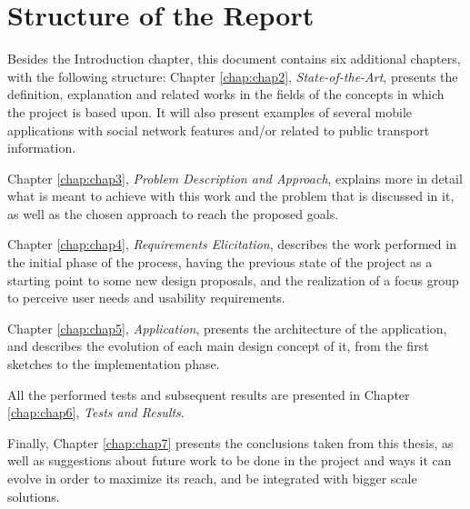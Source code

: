 \section{Structure of the Report} \label{sec:struct}

Besides the Introduction chapter, this document contains six additional chapters, with the following structure:
Chapter \ref{chap:chap2}, \emph{State-of-the-Art}, presents the definition, explanation and related works in the fields of the concepts in which the project is based upon. It will also present examples of several mobile applications with social network features and/or related to public transport information.

Chapter \ref{chap:chap3}, \emph{Problem Description and Approach}, explains more in detail what is meant to achieve with this work and the problem that is discussed in it, as well as the chosen approach to reach the proposed goals.

Chapter \ref{chap:chap4}, \emph{Requirements Elicitation}, describes the work performed in the initial phase of the process, having the previous state of the project as a starting point to some new design proposals, and the realization of a focus group to perceive user needs and usability requirements.

Chapter \ref{chap:chap5}, \emph{Application}, presents the architecture of the application, and describes the evolution of each main design concept of it, from the first sketches to the implementation phase.

All the performed tests and subsequent results are presented in Chapter \ref{chap:chap6}, \emph{Tests and Results}.

Finally, Chapter \ref{chap:chap7} presents the conclusions taken from this thesis, as well as suggestions about future work to be done in the project and ways it can evolve in order to maximize its reach, and  be integrated with bigger scale solutions.
